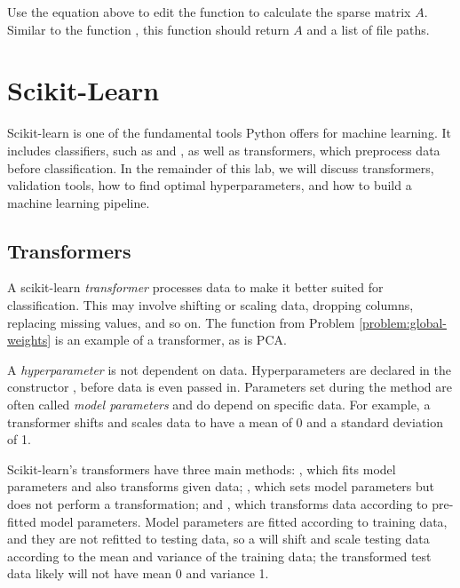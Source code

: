 \begin{problem} %
Use the equation above to edit the function  to calculate the sparse matrix $A$.
Similar to the function , this function should return $A$ and a list of file paths.
\label{problem:global-weights}
\end{problem}

\section*{Scikit-Learn} %

Scikit-learn is one of the fundamental tools Python offers for machine learning.
It includes classifiers, such as  and , as well as transformers, which preprocess data before classification.
In the remainder of this lab, we will discuss transformers, validation tools, how to find optimal hyperparameters, and how to build a machine learning pipeline.

\subsection*{Transformers} %

A scikit-learn \emph{transformer} processes data to make it better suited for classification.
This may involve shifting or scaling data, dropping columns, replacing missing values, and so on.
The function from Problem \ref{problem:global-weights} is an example of a transformer, as is PCA.

\begin{info}
A \emph{hyperparameter} is not dependent on data.
Hyperparameters are declared in the constructor , before data is even passed in.
Parameters set during the  method are often called \emph{model parameters} and do depend on specific data.
For example, a  transformer shifts and scales data to have a mean of 0 and a standard deviation of 1.

Scikit-learn's transformers have three main methods: , which fits model parameters and also transforms given data; , which sets model parameters but does not perform a transformation; and , which transforms data according to pre-fitted model parameters.
Model parameters are fitted according to training data, and they are not refitted to testing data, so a  will shift and scale testing data according to the mean and variance of the training data; the transformed test data likely will not have mean 0 and variance 1.
\end{info}

